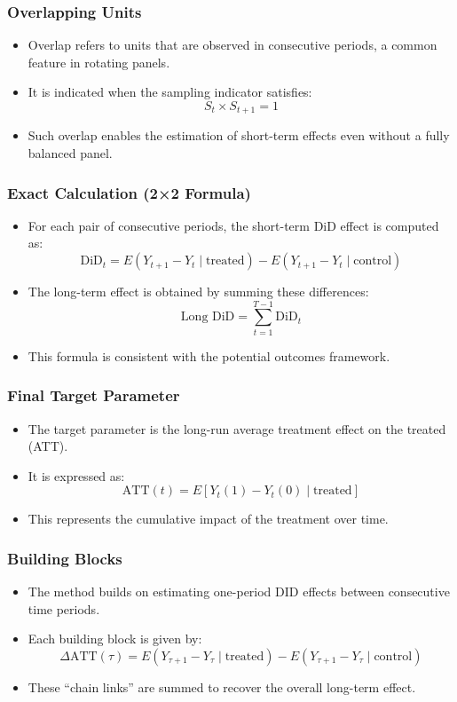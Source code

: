 \documentclass{beamer}
\begin{document}
\begin{frame}
\frametitle{Overlapping Units}
\begin{itemize}
  \item Overlap refers to units that are observed in consecutive periods, a common feature in rotating panels.
  \item It is indicated when the sampling indicator satisfies: 
    \[
      S_t \times S_{t+1} = 1
    \]
  \item Such overlap enables the estimation of short-term effects even without a fully balanced panel.
\end{itemize}
\end{frame}

\begin{frame}
\frametitle{Exact Calculation (2×2 Formula)}
\begin{itemize}
  \item For each pair of consecutive periods, the short-term DiD effect is computed as:
    \[
      \text{DiD}_t = E(Y_{t+1} - Y_t \mid \text{treated}) - E(Y_{t+1} - Y_t \mid \text{control})
    \]
  \item The long-term effect is obtained by summing these differences:
    \[
      \text{Long DiD} = \sum_{t=1}^{T-1} \text{DiD}_t
    \]
  \item This formula is consistent with the potential outcomes framework.
\end{itemize}
\end{frame}

\begin{frame}
\frametitle{Final Target Parameter}
\begin{itemize}
  \item The target parameter is the long-run average treatment effect on the treated (ATT).
  \item It is expressed as:
    \[
      \text{ATT}(t) = E[Y_t(1) - Y_t(0) \mid \text{treated}]
    \]
  \item This represents the cumulative impact of the treatment over time.
\end{itemize}
\end{frame}

\begin{frame}
\frametitle{Building Blocks}
\begin{itemize}
  \item The method builds on estimating one-period DID effects between consecutive time periods.
  \item Each building block is given by:
    \[
      \Delta \text{ATT}(\tau) = E(Y_{\tau+1} - Y_\tau \mid \text{treated}) - E(Y_{\tau+1} - Y_\tau \mid \text{control})
    \]
  \item These “chain links” are summed to recover the overall long-term effect.
\end{itemize}
\end{frame}
\end{document}
